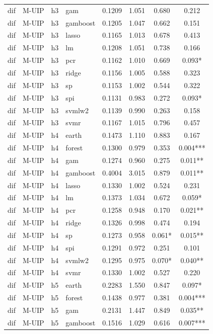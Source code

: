 \begin{ThreePartTable}
\begin{longtable}[t]{llclcccc}
dif & M-UIP & h3 & gam & 0.1209 & 1.051 & 0.680 & 0.212\\
dif & M-UIP & h3 & gamboost & 0.1205 & 1.047 & 0.662 & 0.151\\
dif & M-UIP & h3 & lasso & 0.1165 & 1.013 & 0.678 & 0.413\\
dif & M-UIP & h3 & lm & 0.1208 & 1.051 & 0.738 & 0.166\\
dif & M-UIP & h3 & pcr & 0.1162 & 1.010 & 0.669 & 0.093*\\
dif & M-UIP & h3 & ridge & 0.1156 & 1.005 & 0.588 & 0.323\\
dif & M-UIP & h3 & sp & 0.1153 & 1.002 & 0.544 & 0.322\\
dif & M-UIP & h3 & spi & 0.1131 & 0.983 & 0.272 & 0.093*\\
dif & M-UIP & h3 & svmlw2 & 0.1139 & 0.990 & 0.263 & 0.158\\
dif & M-UIP & h3 & svmr & 0.1167 & 1.015 & 0.796 & 0.457\\
\addlinespace
dif & M-UIP & h4 & earth & 0.1473 & 1.110 & 0.883 & 0.167\\
dif & M-UIP & h4 & forest & 0.1300 & 0.979 & 0.353 & 0.004***\\
dif & M-UIP & h4 & gam & 0.1274 & 0.960 & 0.275 & 0.011**\\
dif & M-UIP & h4 & gamboost & 0.4004 & 3.015 & 0.879 & 0.011**\\
dif & M-UIP & h4 & lasso & 0.1330 & 1.002 & 0.524 & 0.231\\
dif & M-UIP & h4 & lm & 0.1373 & 1.034 & 0.672 & 0.059*\\
dif & M-UIP & h4 & pcr & 0.1258 & 0.948 & 0.170 & 0.021**\\
dif & M-UIP & h4 & ridge & 0.1326 & 0.998 & 0.474 & 0.194\\
dif & M-UIP & h4 & sp & 0.1273 & 0.958 & 0.061* & 0.015**\\
dif & M-UIP & h4 & spi & 0.1291 & 0.972 & 0.251 & 0.101\\
dif & M-UIP & h4 & svmlw2 & 0.1295 & 0.975 & 0.070* & 0.040**\\
dif & M-UIP & h4 & svmr & 0.1330 & 1.002 & 0.527 & 0.220\\
\addlinespace
dif & M-UIP & h5 & earth & 0.2283 & 1.550 & 0.847 & 0.097*\\
dif & M-UIP & h5 & forest & 0.1438 & 0.977 & 0.381 & 0.004***\\
dif & M-UIP & h5 & gam & 0.2131 & 1.447 & 0.849 & 0.035**\\
dif & M-UIP & h5 & gamboost & 0.1516 & 1.029 & 0.616 & 0.007***\\

\end{longtable}
\end{ThreePartTable}
